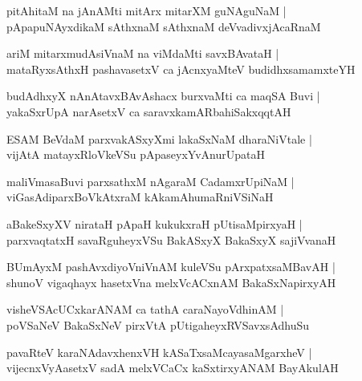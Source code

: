 \documentclass[twoside,12pt,openright]{book}
\newcounter{shloka}[chapter]
\begin{document}
\begin{shloka}%
pitAhitaM na jAnAMti mitArx mitarXM guNAguNaM |\\
pApapuNAyxdikaM sAthxnaM sAthxnaM deVvadivxjAcaRnaM 
\end{shloka}

\begin{shloka}%
ariM mitarxmudAsiVnaM na viMdaMti savxBAvataH |\\
mataRyxsAthxH pashavasetxV ca jAcnxyaMteV budidhxsamamxteYH 
\end{shloka}

\begin{shloka}%
budAdhxyX nAnAtavxBAvAshacx burxvaMti ca maqSA Buvi |\\
yakaSxrUpA narAsetxV ca saravxkamARbahiSakxqqtAH 
\end{shloka}

\begin{shloka}%
ESAM BeVdaM parxvakASxyXmi lakaSxNaM dharaNiVtale |\\
vijAtA matayxRloVkeVSu pApaseyxYvAnurUpataH 
\end{shloka}

\begin{shloka}%
maliVmasaBuvi parxsathxM nAgaraM CadamxrUpiNaM |\\
viGasAdiparxBoVkAtxraM kAkamAhumaRniVSiNaH 
\end{shloka}

\begin{shloka}%
aBakeSxyXV nirataH pApaH kukukxraH pUtisaMpirxyaH |\\
parxvaqtatxH savaRguheyxVSu BakASxyX BakaSxyX sajiVvanaH 
\end{shloka}

\begin{shloka}%
BUmAyxM pashAvxdiyoVniVnAM kuleVSu pArxpatxsaMBavAH |\\
shunoV vigaqhayx hasetxVna melxVcACxnAM BakaSxNapirxyAH 
\end{shloka}

\begin{shloka}%
visheVSAcUCxkarANAM ca tathA caraNayoVdhinAM |\\
poVSaNeV BakaSxNeV pirxVtA pUtigaheyxRVSavxsAdhuSu
\end{shloka}

\begin{shloka}%
pavaRteV karaNAdavxhenxVH kASaTxsaMcayasaMgarxheV |\\
vijecnxVyAasetxV sadA melxVCaCx kaSxtirxyANAM BayAkulAH 
\end{shloka}
\end{document}
